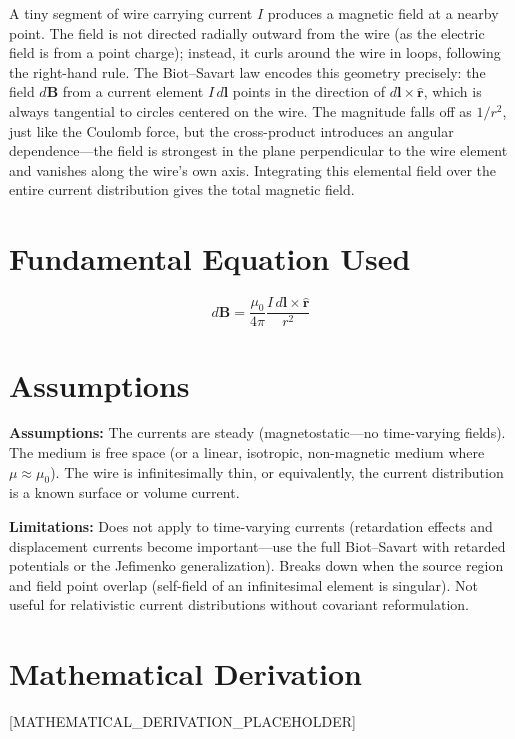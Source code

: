 \documentclass[11pt,openright]{book}
\begin{document}
A tiny segment of wire carrying current $I$ produces a magnetic field at a nearby point. The field is not directed radially outward from the wire (as the electric field is from a point charge); instead, it curls around the wire in loops, following the right-hand rule. The Biot--Savart law encodes this geometry precisely: the field $d\mathbf{B}$ from a current element $I\,d\mathbf{l}$ points in the direction of $d\mathbf{l}\times\hat{\mathbf{r}}$, which is always tangential to circles centered on the wire. The magnitude falls off as $1/r^2$, just like the Coulomb force, but the cross-product introduces an angular dependence---the field is strongest in the plane perpendicular to the wire element and vanishes along the wire's own axis. Integrating this elemental field over the entire current distribution gives the total magnetic field.
\section*{Fundamental Equation Used}

\begin{equation}
d\mathbf{B} = \frac{\mu_0}{4\pi}\frac{I\,d\mathbf{l}\times\hat{\mathbf{r}}}{r^2}
\end{equation}
\section*{Assumptions}

\textbf{Assumptions:} The currents are steady (magnetostatic---no time-varying fields). The medium is free space (or a linear, isotropic, non-magnetic medium where $\mu \approx \mu_0$). The wire is infinitesimally thin, or equivalently, the current distribution is a known surface or volume current.


\textbf{Limitations:} Does not apply to time-varying currents (retardation effects and displacement currents become important---use the full Biot--Savart with retarded potentials or the Jefimenko generalization). Breaks down when the source region and field point overlap (self-field of an infinitesimal element is singular). Not useful for relativistic current distributions without covariant reformulation.


\section*{Mathematical Derivation}

[MATHEMATICAL_DERIVATION_PLACEHOLDER]
\end{document}
